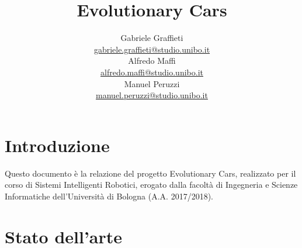 \documentclass[a4paper,12pt]{article}
\title{\Huge \textbf{Evolutionary Cars} \\
	\vspace{10pt}
	\vspace{20pt}
}
\author{
	Gabriele Graffieti \\ \small \url{gabriele.graffieti@studio.unibo.it}
	\vspace{15pt}
	\\
	Alfredo Maffi \\ \small \url{alfredo.maffi@studio.unibo.it}
	\vspace{15pt}
	\\
	Manuel Peruzzi \\ \small \url{manuel.peruzzi@studio.unibo.it}
}
\date{}
\begin{document}
\maketitle
{}
\newpage
\tableofcontents
\newpage

\section{Introduzione}

Questo documento è la relazione del progetto Evolutionary Cars, realizzato per il corso di Sistemi Intelligenti Robotici, erogato dalla facoltà di Ingegneria e Scienze Informatiche dell'Università di Bologna (A.A. 2017/2018).

\section{Stato dell'arte}
\end{document}
